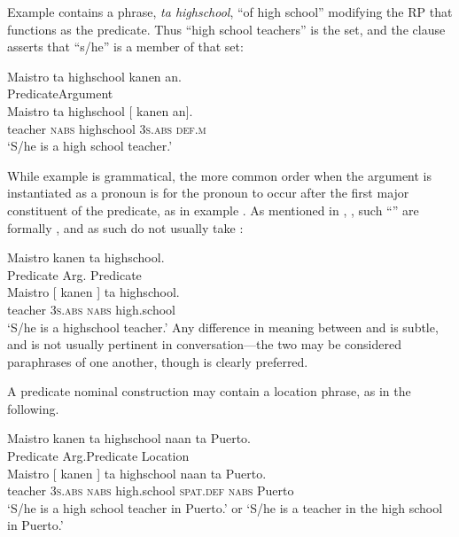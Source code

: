 Example  contains a phrase, \textit{ta highschool}, “of high school” modifying the RP that functions as the predicate. Thus “high school teachers” is the set, and the clause asserts that “s/he” is a member of that set:

\newpage
\ea
\label{bkm:Ref428962681}
Maistro  ta  highschool  kanen  an. \\\smallskip
Predicate\hspace{2.7cm}Argument \\
\gll Maistro  ta  highschool [ kanen  an\hspace{3pt}]. \\
teacher  \textsc{nabs}  highschool {}  3\textsc{s.abs}  \textsc{def.m} \\
\glt ‘S/he is a high school teacher.’
\z

While example  is grammatical, the more common order when the argument is instantiated as a pronoun is for the pronoun to occur after the first major constituent of the predicate, as in example . As mentioned in , , such “” are formally , and as such do not usually take :

\ea
\label{bkm:Ref428962810}
Maistro  kanen  ta  highschool. \\\smallskip
Predicate  Arg.\hspace{.5cm}  Predicate \\
\gll Maistro{  }[ kanen ] ta  highschool. \\
teacher 3\textsc{s.abs}  {}  \textsc{nabs}  high.school \\
\glt ‘S/he is a highschool teacher.’ 
\z
Any difference in meaning between  and  is subtle, and is not usually pertinent in conversation---the two may be considered paraphrases of one another, though  is clearly preferred.

A predicate nominal construction may contain a location phrase, as in the following.

\ea
Maistro  kanen  ta  highschool  naan  ta  Puerto. \\\smallskip
Predicate  Arg.\hspace{.5cm}Predicate\hspace{1.2cm}  Location \\
\gll Maistro [ kanen ] ta  highschool  naan  ta  Puerto. \\
teacher {} 3\textsc{s.abs} {} \textsc{nabs}  high.school  \textsc{spat.def}  \textsc{nabs}  Puerto \\
\glt ‘S/he is a high school teacher in Puerto.’ or ‘S/he is a teacher in the high school in Puerto.’ 
\z

